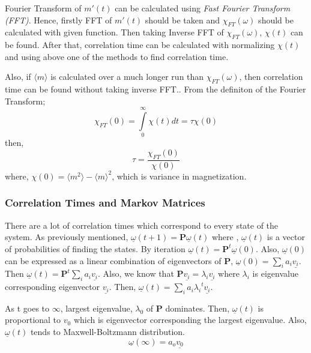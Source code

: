 \documentclass[12pt,fleqn]{report}
\begin{document}
Fourier Transform of $m'(t)$ can be calculated using \textit{Fast Fourier Transform (FFT)}.  Hence, firstly FFT of $m'(t)$ should be taken and $\chi_{FT}(\omega)$ should be calculated with given function. Then taking Inverse FFT of $\chi_{FT}(\omega)$, $\chi (t)$ can be found.  After that, correlation time can be calculated with normalizing  $\chi (t) $ and using above one of the methods to find correlation time. 

Also, if $\langle m\rangle$ is calculated over a much longer run than $\chi_{FT} (\omega)$, then correlation time can be found without taking inverse FFT.\cite[p. 65]{newman}. From the definiton of the Fourier Transform;
\begin{equation}
\chi_{FT} (0) = \int \limits_{0}^\infty \chi (t)dt = \tau \chi (0)
\end{equation}
then,
\begin{equation}
\tau = \frac{\chi_{FT} (0)}{\chi (0)}
\end{equation}
where, $\chi (0) = \langle m^2\rangle  - \langle m\rangle^2$, which is variance in magnetization.

\subsubsection{Correlation Times and Markov Matrices}

There are a lot of correlation times which correspond to every state of the system. As previously mentioned,  $ \underline{\omega}(t+1) = \textbf{P} \underline{\omega}(t) $ where , $ \underline{\omega}(t)$ is a vector of probabilities of finding the states. By iteration $  \underline{\omega}(t) = \textbf{P}^t \underline{\omega}(0)$. 
Also, $\underline{\omega}(0)$ can be expressed as a linear combination of eigenvectors of $\textbf{P}$, $\underline{\omega }(0) = \sum\limits_{i} a_i \underline{v_i} $. Then $  \underline{\omega}(t) = \textbf{P}^t \sum\limits_{i} a_i\underline{v_i} $. Also, we know that $ \textbf{P} \underline{v_i} = \lambda_i \underline{v_i} $ where $ \lambda_i $ is eigenvalue corresponding eigenvector $ \underline{v_i} $. Then, $ \underline{\omega}(t) = \sum\limits_{i} a_i {\lambda_i}^t \underline{v_i} $.

As t goes to $\infty$, largest eigenvalue, $\lambda_0$ of $\textbf{P}$ dominates. Then, $\underline{\omega}(t) $ is proportional to $v_0$ which is eigenvector corresponding the largest eigenvalue. Also, $\underline{\omega}(t)$ tends to Maxwell-Boltzmann distribution. 
\begin{equation}
\underline{\omega}(\infty) = a_o \underline{v_0}
\end{equation}
\end{document}
